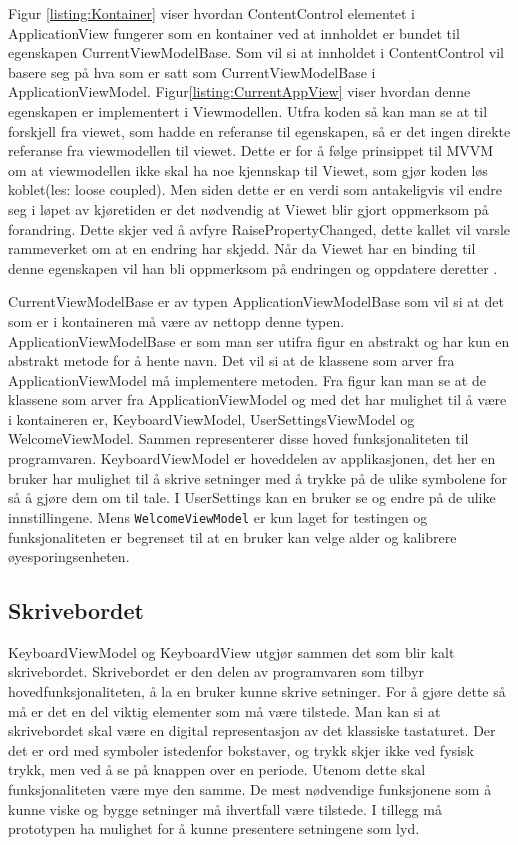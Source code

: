 { 
Figur \ref{listing:Kontainer} viser hvordan ContentControl elementet i ApplicationView fungerer som en kontainer ved at innholdet er bundet til egenskapen CurrentViewModelBase. Som vil si at innholdet i ContentControl vil basere seg på hva som er satt som CurrentViewModelBase i ApplicationViewModel. Figur\ref{listing:CurrentAppView} viser hvordan denne egenskapen er implementert i Viewmodellen. Utfra koden så kan man se at til forskjell fra viewet, som hadde en referanse til egenskapen, så er det ingen direkte referanse fra viewmodellen til viewet. Dette er for å følge prinsippet til MVVM om at viewmodellen ikke skal ha noe kjennskap til Viewet, som gjør koden løs koblet(les: loose coupled). Men siden dette er en verdi som antakeligvis vil endre seg i løpet av kjøretiden er det nødvendig at Viewet blir gjort oppmerksom på forandring. Dette skjer ved å avfyre RaisePropertyChanged, dette kallet vil varsle rammeverket om at en endring har skjedd. Når da Viewet har en binding til denne egenskapen vil han bli oppmerksom på endringen og oppdatere deretter \cite{MVVM4:online}. 
 
CurrentViewModelBase er av typen ApplicationViewModelBase som vil si at det som er i kontaineren må være av nettopp denne typen. ApplicationViewModelBase er som man ser utifra figur  en abstrakt og har kun en abstrakt metode for å hente navn.  Det vil si at de klassene som arver fra ApplicationViewModel må implementere metoden. Fra figur kan man se at de klassene som arver fra ApplicationViewModel og med det har mulighet til å være i kontaineren er, KeyboardViewModel, UserSettingsViewModel og WelcomeViewModel. Sammen representerer disse hoved funksjonaliteten til programvaren. KeyboardViewModel er hoveddelen av applikasjonen, det her en bruker har mulighet til å skrive setninger med å trykke på de ulike symbolene for så å gjøre dem om til tale. I UserSettings kan en bruker se og endre på de ulike innstillingene. Mens \texttt{WelcomeViewModel} er kun laget for testingen og funksjonaliteten er begrenset til at en bruker kan velge alder og kalibrere øyesporingsenheten. 
 
 
 \subsection{Skrivebordet}
 
KeyboardViewModel og KeyboardView utgjør sammen det som blir kalt skrivebordet. Skrivebordet er den delen av programvaren som tilbyr hovedfunksjonaliteten, å la en bruker kunne skrive setninger. For å gjøre dette så må er det en del viktig elementer som må være tilstede. Man kan si at skrivebordet skal være en digital representasjon av det klassiske tastaturet. Der det er ord med symboler istedenfor bokstaver, og trykk skjer ikke ved fysisk trykk, men ved å se på knappen over en periode. Utenom dette skal funksjonaliteten være mye den samme. De mest nødvendige funksjonene som å kunne viske og bygge setninger må ihvertfall være tilstede. I tillegg må prototypen ha mulighet for å kunne presentere setningene som lyd. 

}
